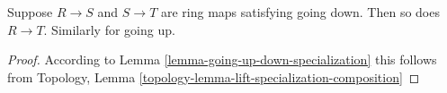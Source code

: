 \begin{lemma}
\label{lemma-going-up-down-composition}
Suppose $R \to S$ and $S \to T$ are ring maps satisfying
going down. Then so does $R \to T$. Similarly for going up.
\end{lemma}

\begin{proof}
According to Lemma \ref{lemma-going-up-down-specialization}
this follows from
Topology, Lemma \ref{topology-lemma-lift-specialization-composition}
\end{proof}